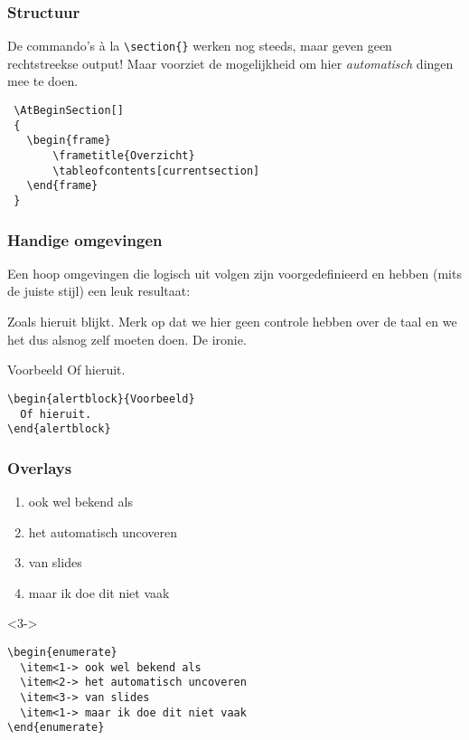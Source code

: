 \begin{frame}[fragile]
  \frametitle{Structuur}

  De commando's \`a la \verb|\section{}| werken nog steeds, maar geven geen rechtstreekse output! Maar  voorziet de mogelijkheid om hier \emph{automatisch} dingen mee te doen.
  \begin{verbatim}
 \AtBeginSection[]
 {
   \begin{frame}
 	   \frametitle{Overzicht}
 	   \tableofcontents[currentsection]
   \end{frame}
 }
  \end{verbatim}
\end{frame}

\begin{frame}[fragile]
  \frametitle{Handige omgevingen}

  \footnotesize
  Een hoop omgevingen die logisch uit  volgen zijn voorgedefinieerd en hebben (mits de juiste stijl) een leuk resultaat:
  \begin{definition}
    Zoals hieruit blijkt. Merk op dat we hier geen controle hebben over de taal en we het dus alsnog zelf moeten doen. De ironie.
  \end{definition}

  \begin{alertblock}{Voorbeeld}
    Of hieruit.
  \end{alertblock}
  \begin{verbatim}
\begin{alertblock}{Voorbeeld}
  Of hieruit.
\end{alertblock}
  \end{verbatim}
\end{frame}

\begin{frame}[fragile]
  \frametitle{Overlays}

  \small
  \begin{enumerate}
    \item<1-> ook wel bekend als
    \item<2-> het automatisch uncoveren
    \item<3-> van slides
    \item<1-> maar ik doe dit niet vaak
  \end{enumerate}
  \begin{uncoverenv}<3->
  \begin{verbatim}
\begin{enumerate}
  \item<1-> ook wel bekend als
  \item<2-> het automatisch uncoveren
  \item<3-> van slides
  \item<1-> maar ik doe dit niet vaak
\end{enumerate}
\end{verbatim}
  \end{uncoverenv}
\end{frame}

